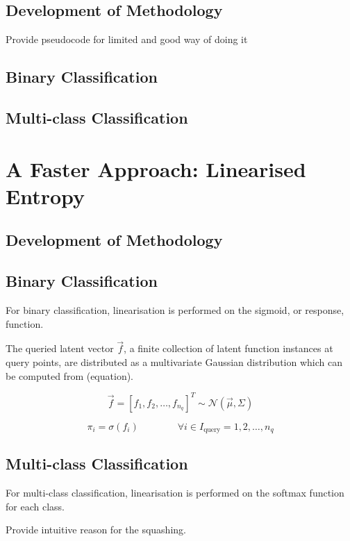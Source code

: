 		\subsection{Development of Methodology}
		
			Provide pseudocode for limited and good way of doing it
			
		\subsection{Binary Classification}
		
		\subsection{Multi-class Classification}
		
	\section{A Faster Approach: Linearised Entropy}
		
		\subsection{Development of Methodology}
		
		\subsection{Binary Classification}
		
			For binary classification, linearisation is performed on the sigmoid, or response, function.
		
			The queried latent vector $\vec{f}$, a finite collection of latent function instances at query points, are distributed as a multivariate Gaussian distribution which can be computed from (equation). 
			
			\begin{equation}
				\vec{f} = [f_{1}, f_{2}, \dots, f_{n_{q}}]^{T} \sim \mathcal{N}(\vec{\mu}, \Sigma)
			\end{equation}
				
			\begin{equation}
				\pi_{i} = \sigma(f_{i}) \qquad \qquad \forall i \in I_{\mathrm{query}} = {1, 2, \dots, n_{q}}
			\end{equation}
			
		\subsection{Multi-class Classification}
		
			For multi-class classification, linearisation is performed on the softmax function for each class.
			
			Provide intuitive reason for the squashing.
			
		
